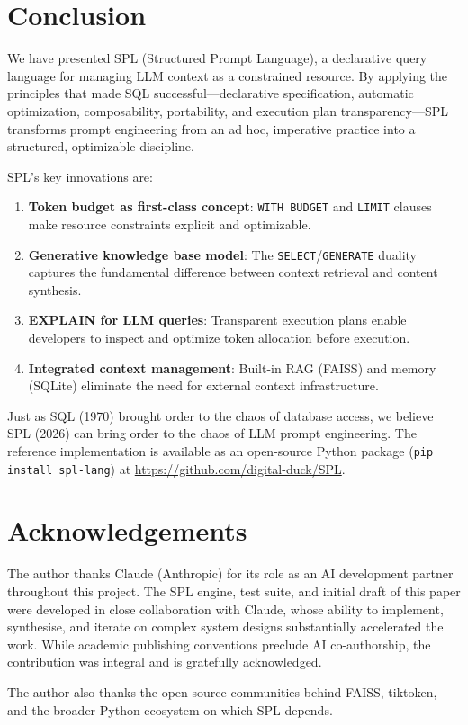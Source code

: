 \documentclass[11pt,a4paper]{article}
\begin{document}
\section{Conclusion}
\label{sec:conclusion}

We have presented SPL (Structured Prompt Language), a declarative query language for managing LLM context as a constrained resource. By applying the principles that made SQL successful---declarative specification, automatic optimization, composability, portability, and execution plan transparency---SPL transforms prompt engineering from an ad hoc, imperative practice into a structured, optimizable discipline.

SPL's key innovations are:

\begin{enumerate}[nosep]
  \item \textbf{Token budget as first-class concept}: \texttt{WITH BUDGET} and \texttt{LIMIT} clauses make resource constraints explicit and optimizable.
  \item \textbf{Generative knowledge base model}: The \texttt{SELECT}/\texttt{GENERATE} duality captures the fundamental difference between context retrieval and content synthesis.
  \item \textbf{EXPLAIN for LLM queries}: Transparent execution plans enable developers to inspect and optimize token allocation before execution.
  \item \textbf{Integrated context management}: Built-in RAG (FAISS) and memory (SQLite) eliminate the need for external context infrastructure.
\end{enumerate}

Just as SQL (1970) brought order to the chaos of database access, we believe SPL (2026) can bring order to the chaos of LLM prompt engineering. The reference implementation is available as an open-source Python package (\texttt{pip install spl-lang}) at \url{https://github.com/digital-duck/SPL}.


\section*{Acknowledgements}

The author thanks Claude (Anthropic) for its role as an AI development partner throughout
this project. The SPL engine, test suite, and initial draft of this paper were developed
in close collaboration with Claude, whose ability to implement, synthesise, and iterate
on complex system designs substantially accelerated the work. While academic publishing
conventions preclude AI co-authorship, the contribution was integral and is gratefully
acknowledged.

The author also thanks the open-source communities behind FAISS, tiktoken, and the
broader Python ecosystem on which SPL depends.



\end{document}
